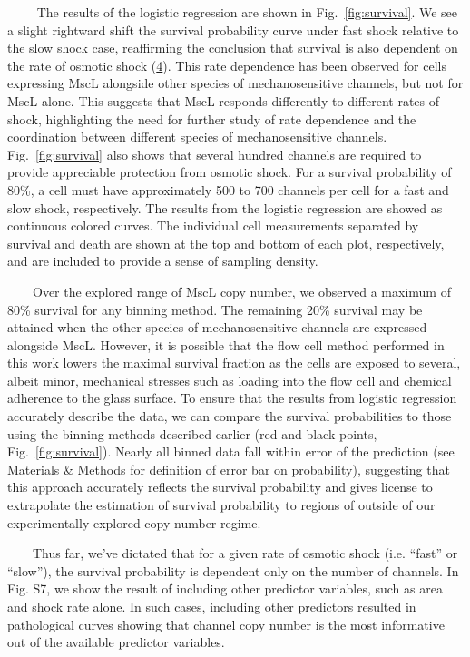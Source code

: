 ~~~~
The
results
of the
logistic
regression
are
shown
in
Fig.~\ref{fig:survival}.
We see
a
slight
rightward
shift
the
survival
probability
curve
under
fast
shock
relative
to the
slow
shock
case,
reaffirming
the
conclusion
that
survival
is
also
dependent
on the
rate
of
osmotic
shock
(\protect\hyperlink{ref-bialecka-fornal2015}{4}).
This
rate
dependence
has
been
observed
for
cells
expressing
MscL
alongside
other
species
of
mechanosensitive
channels,
but
not
for
MscL
alone.
This
suggests
that
MscL
responds
differently
to
different
rates
of
shock,
highlighting
the
need
for
further
study
of
rate
dependence
and
the
coordination
between
different
species
of
mechanosensitive
channels.
Fig.~\ref{fig:survival}
also
shows
that
several
hundred
channels
are
required
to
provide
appreciable
protection
from
osmotic
shock.
For a
survival
probability
of
80\%,
a cell
must
have
approximately
500 to
700
channels
per
cell
for a
fast
and
slow
shock,
respectively.
The
results
from
the
logistic
regression
are
showed
as
continuous
colored
curves.
The
individual
cell
measurements
separated
by
survival
and
death
are
shown
at the
top
and
bottom
of
each
plot,
respectively,
and
are
included
to
provide
a
sense
of
sampling
density.

~~~~Over
the
explored
range
of
MscL
copy
number,
we
observed
a
maximum
of
80\%
survival
for
any
binning
method.
The
remaining
20\%
survival
may be
attained
when
the
other
species
of
mechanosensitive
channels
are
expressed
alongside
MscL.
However,
it is
possible
that
the
flow
cell
method
performed
in
this
work
lowers
the
maximal
survival
fraction
as the
cells
are
exposed
to
several,
albeit
minor,
mechanical
stresses
such
as
loading
into
the
flow
cell
and
chemical
adherence
to the
glass
surface.
To
ensure
that
the
results
from
logistic
regression
accurately
describe
the
data,
we can
compare
the
survival
probabilities
to
those
using
the
binning
methods
described
earlier
(red
and
black
points,
Fig.~\ref{fig:survival}).
Nearly
all
binned
data
fall
within
error
of the
prediction
(see
Materials
\&
Methods
for
definition
of
error
bar on
probability),
suggesting
that
this
approach
accurately
reflects
the
survival
probability
and
gives
license
to
extrapolate
the
estimation
of
survival
probability
to
regions
of
outside
of our
experimentally
explored
copy
number
regime.

~~~~Thus
far,
we've
dictated
that
for a
given
rate
of
osmotic
shock
(i.e.
``fast''
or
``slow''),
the
survival
probability
is
dependent
only
on the
number
of
channels.
In
Fig.
S7, we
show
the
result
of
including
other
predictor
variables,
such
as
area
and
shock
rate
alone.
In
such
cases,
including
other
predictors
resulted
in
pathological
curves
showing
that
channel
copy
number
is the
most
informative
out of
the
available
predictor
variables.

